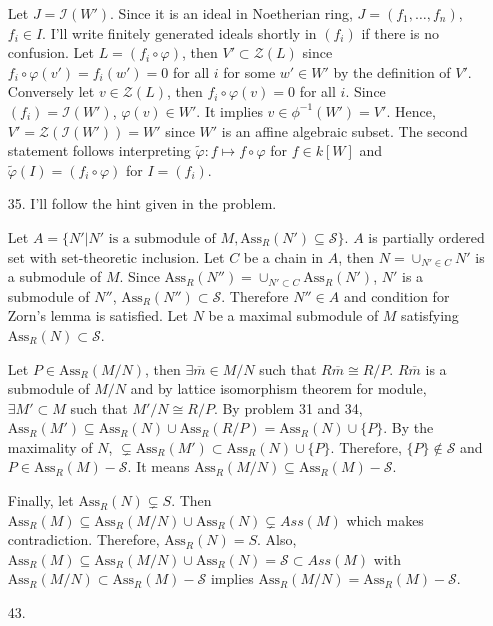 \documentclass[12pt]{article}
\newcommand{\Ass}{\text{Ass}_R}
\newcommand{\I}{\mathcal{I}}
\newcommand{\Z}{\mathcal{Z}}
\begin{document}
\begin{enumerate}
Let $J=\I(W')$. Since it is an ideal in Noetherian ring, $J=(f_1, \ldots, f_n)$, $f_i\in I$. I'll write finitely generated ideals shortly in $(f_i)$ if there is no confusion. Let $L=(f_i\circ \varphi)$, then $V'\subset \Z(L)$ since $f_i\circ\varphi(v')=f_i(w')=0$ for all $i$ for some $w'\in W'$ by the definition of $V'$. Conversely let $v\in \Z(L)$, then $f_i\circ\varphi(v)=0$ for all $i$. Since $(f_i)=\I(W')$, $\varphi(v)\in W'$. It implies $v\in \phi^{-1}(W')=V'$. Hence, $V'=\Z\left(\I(W')\right)=W'$ since $W'$ is an affine algebraic subset. The second statement follows interpreting $\tilde{\varphi}:f\mapsto f\circ \varphi$ for $f\in k[W]$ and $\tilde{\varphi}(I)=(f_i\circ \varphi)$ for $I=(f_i)$.
\item[35.] I'll follow the hint given in the problem.

Let $A=\{N'|N'\text{ is a submodule of }M,\text{Ass}_R(N')\subseteq \mathcal{S}\}$. $A$ is partially ordered set with set-theoretic inclusion. Let $C$ be a chain in $A$, then $N=\cup_{N'\in C}N'$ is a submodule of $M$. Since $\Ass(N'')=\cup_{N'\subset C}\Ass(N')$, $N'$ is a submodule of $N''$, $\Ass(N'')\subset \mathcal{S}$. Therefore $N''\in A$ and condition for Zorn's lemma is satisfied. Let $N$ be a maximal submodule of $M$ satisfying $\Ass(N)\subset \mathcal{S}$.

Let $P\in \Ass(M/N)$, then $\exists \overline{m}\in M/N$ such that $R\overline{m}\cong R/P$. $R\overline{m}$ is a submodule of $M/N$ and by lattice isomorphism theorem for module, $\exists M'\subset M$ such that $M'/N\cong R/P$. By problem 31 and 34, $\Ass(M')\subseteq \Ass(N)\cup \Ass(R/P)=\Ass(N)\cup \{P\}$. By the maximality of $N$, $\subsetneq\Ass(M')\subset \Ass(N)\cup \{P\}$. Therefore, $\{P\}\notin \mathcal{S}$ and $P\in \Ass(M)-\mathcal{S}$. It means $\Ass(M/N)\subseteq \Ass(M)-\mathcal{S}$.

Finally, let $\Ass(N)\subsetneq S$. Then $\Ass(M)\subseteq \Ass(M/N)\cup \Ass(N)\subsetneq Ass(M)$ which makes contradiction. Therefore, $\Ass(N)=S$. Also, $\Ass(M)\subseteq \Ass(M/N)\cup \Ass(N)=\mathcal{S}\subset Ass(M)$ with $\Ass(M/N)\subset \Ass(M)-\mathcal{S}$ implies $\Ass(M/N)=\Ass(M)-\mathcal{S}$.
\item[43.]
\end{enumerate}
\end{document}
